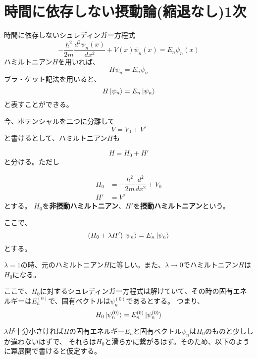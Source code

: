 \section{時間に依存しない摂動論(縮退なし)1次}
時間に依存しないシュレディンガー方程式
\begin{equation*}
  \label{time_independent_schrodinger_eq2}
  - \dfrac{\hbar^2}{2m} \dfrac{d^2 \psi_n(x)}{d x^2} + V(x)\psi_n(x) = E_n\psi_n(x)
\end{equation*}
ハミルトニアン$H$を用いれば、
\begin{equation}
  H\psi_n = E_n\psi_n
\end{equation}
ブラ・ケット記法を用いると、
\begin{equation}
  H \ket{\psi_n} = E_n \ket{\psi_n}
\end{equation}
と表すことができる。

今、ポテンシャルを二つに分離して
\begin{equation}
  V = V_0 + V'
\end{equation}
と書けるとして、ハミルトニアン$H$も

\begin{equation}
  H = H_0 + H'
\end{equation}
と分ける。ただし

\begin{align}
  H_0 &= -\dfrac{\hbar^2}{2m} \dfrac{d^2}{dx^2} + V_0 \\
  H'  &= V'
\end{align}
とする。
$H_0$を{\bf 非摂動ハミルトニアン}、$H'$を{\bf 摂動ハミルトニアン}という。

ここで、
\begin{equation}
  \label{schrodinger_EQ}
  (H_0 + \lambda H')\ket{\psi_n} = E_n\ket{\psi_n}
\end{equation}
とする。

$\lambda = 1$の時、元のハミルトニアン$H$に等しい。また、$\lambda \to 0$でハミルトニアン$H$は$H_0$になる。


ここで、$H_0$に対するシュレディンガー方程式は解けていて、その時の固有エネルギーは$E_{n}^{(0)}$で、固有ベクトルは$\psi_{n}^{(0)}$であるとする。
つまり、
\begin{equation}
  H_0 \ket{\psi_{n}^{(0)}} = E_{n}^{(0)}\ket{\psi_{n}^{(0)}}
\end{equation}

$\lambda$が十分小さければ$H$の固有エネルギー$E_{n}$と固有ベクトル$\psi_{n}$は$H_0$のものと少ししか違わないはずで、
それらは$H_0$と滑らかに繋がるはず。そのため、以下のように冪展開で書けると仮定する。

